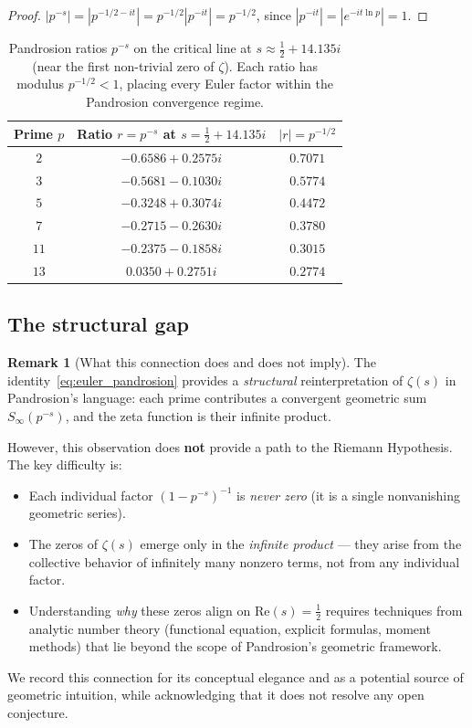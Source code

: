 \documentclass[11pt,a4paper]{article}
\theoremstyle{definition}
\newtheorem{remark}{Remark}[section]
\begin{document}
\begin{proof}
$|p^{-s}| = |p^{-1/2 - it}| = p^{-1/2} |p^{-it}| = p^{-1/2}$, since $|p^{-it}| = |e^{-it \ln p}| = 1$.
\end{proof}

\begin{table}[h]
\centering
\begin{tabular}{ccc}
\toprule
Prime $p$ & Ratio $r = p^{-s}$ at $s = \tfrac{1}{2} + 14.135i$ & $|r| = p^{-1/2}$ \\
\midrule
$2$ & $-0.6586 + 0.2575i$ & $0.7071$ \\
$3$ & $-0.5681 - 0.1030i$ & $0.5774$ \\
$5$ & $-0.3248 + 0.3074i$ & $0.4472$ \\
$7$ & $-0.2715 - 0.2630i$ & $0.3780$ \\
$11$ & $-0.2375 - 0.1858i$ & $0.3015$ \\
$13$ & $0.0350 + 0.2751i$ & $0.2774$ \\
\bottomrule
\end{tabular}
\caption{Pandrosion ratios $p^{-s}$ on the critical line at $s \approx \tfrac{1}{2} + 14.135i$ (near the first non-trivial zero of $\zeta$).  Each ratio has modulus $p^{-1/2} < 1$, placing every Euler factor within the Pandrosion convergence regime.}
\label{tab:critical_ratios}
\end{table}

\subsection{The structural gap}

\begin{remark}[What this connection does and does not imply]
\label{rem:honest}
The identity~\eqref{eq:euler_pandrosion} provides a \emph{structural} reinterpretation of $\zeta(s)$ in Pandrosion's language: each prime contributes a convergent geometric sum $S_\infty(p^{-s})$, and the zeta function is their infinite product.

However, this observation does \textbf{not} provide a path to the Riemann Hypothesis.  The key difficulty is:
\begin{itemize}
  \item Each individual factor $(1 - p^{-s})^{-1}$ is \emph{never zero} (it is a single nonvanishing geometric series).
  \item The zeros of $\zeta(s)$ emerge only in the \emph{infinite product} --- they arise from the collective behavior of infinitely many nonzero terms, not from any individual factor.
  \item Understanding \emph{why} these zeros align on $\mathrm{Re}(s) = \tfrac{1}{2}$ requires techniques from analytic number theory (functional equation, explicit formulas, moment methods) that lie beyond the scope of Pandrosion's geometric framework.
\end{itemize}
We record this connection for its conceptual elegance and as a potential source of geometric intuition, while acknowledging that it does not resolve any open conjecture.
\end{remark}
\end{document}
